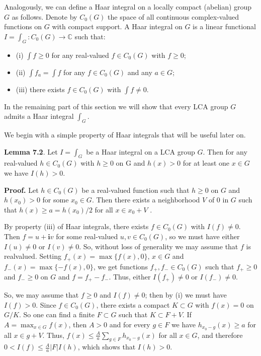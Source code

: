 \documentclass[12pt]{article}
\begin{document}
    Analogously, we can define a Haar integral on a locally compact (abelian) group $G$ as follows. Denote by $C_0(G)$ the
space of all continuous complex-valued functions on $G$ with compact support. A Haar integral on $G$ is a linear functional $I = \int_G : C_0(G) \to \mathbb{C}$
such that:


\begin{itemize}

    \item (i) $\int f \geqslant 0$ for any real-valued $f \in C_0(G)$ with $f \geqslant 0$;

    \item (ii) $\int f_a = \int f$ for any $f \in C_0(G)$ and any $a \in G$;

    \item (iii) there exists $f \in C_0(G)$ with $\int f \neq 0$.

\end{itemize}


    In the remaining part of this section we will show that every LCA group $G$ admits a Haar integral $\int_G$.


    We begin with a simple property of Haar integrals that will be useful later on.


\textbf{Lemma 7.2}. Let $I = \int_G$ be a Haar integral on a LCA group $G$. Then for any real-valued $h \in C_0(G)$ with $h \geqslant 0$ on G and $h(x) > 0$ for at
least one $x \in G$ we have $I(h) > 0$.


\textbf{Proof.} Let $h \in C_0(G)$ be a real-valued function such that $h \geqslant 0$ on $G$ and $h(x_0) > 0$ for some $x_0 \in G$. Then there exists a
neighborhood $V$ of $0$ in $G$ such that $h(x) \geqslant a = h(x_0)/2$ for all $x \in x_0 + V$ .


    By property (iii) of Haar integrals, there exists $f \in C_0(G)$ with $I(f) \neq 0$. Then $f = u + \mathbf{i}v$ for some real-valued
$u, v \in C_0(G)$, so we must have either $I(u) \neq 0$ or $I(v) \neq 0$. So, without loss of generality we may assume that $f$ is
realvalued. Setting $f_+(x) = \max\{f (x), 0\}$, $x \in G$ and $f_-(x) = \max\{- f (x), 0\}$, we get functions $f_+, f_- \in C_0(G)$ such that $f_+ \geqslant 0$
and $f_-\geqslant 0$ on $G$ and $f = f_+ - f_-$. Thus, either $I(f_+) \neq 0$ or $I(f_-) \neq 0$.


    So, we may assume that $f \geqslant 0$ and $I(f ) \neq 0$; then by (i) we must have $I(f ) > 0$. Since $f \in C_0(G)$, there exists a compact
$K \subset G$ with $f (x) = 0$ on $G / K$. So one can find a finite $F \subset G$ such that $K \subset F + V$. If $A = \max_{x \in G} f (x)$, then $A > 0$
and for every $g \in F$ we have $h_{x_0-g} (x) \geqslant a$ for all $x \in g + V$. Thus, $f(x) \leqslant \frac{A}{a} \sum_{g \in F} h_{x_0-g} (x)$ for all $x \in G$, and therefore
$0 < I(f ) \leqslant \frac{A}{a} |F |I(h)$, which shows that $I(h) > 0$. 
\end{document}
